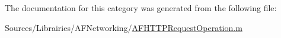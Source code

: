 The documentation for this category was generated from the following file\-:\begin{DoxyCompactItemize}
\item 
Sources/\-Librairies/\-A\-F\-Networking/\hyperlink{_a_f_h_t_t_p_request_operation_8m}{A\-F\-H\-T\-T\-P\-Request\-Operation.\-m}\end{DoxyCompactItemize}
